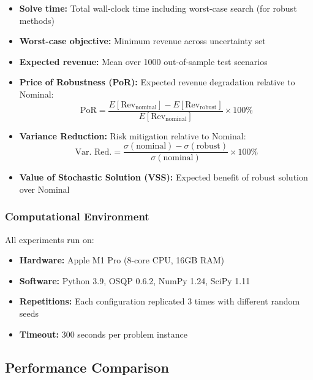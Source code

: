 \begin{itemize}
    \item \textbf{Solve time:} Total wall-clock time including worst-case search (for robust methods)
    \item \textbf{Worst-case objective:} Minimum revenue across uncertainty set
    \item \textbf{Expected revenue:} Mean over 1000 out-of-sample test scenarios
    \item \textbf{Price of Robustness (PoR):} Expected revenue degradation relative to Nominal:
    \begin{equation}
    \text{PoR} = \frac{E[\text{Rev}_{\text{nominal}}] - E[\text{Rev}_{\text{robust}}]}{E[\text{Rev}_{\text{nominal}}]} \times 100\%
    \end{equation}

    \item \textbf{Variance Reduction:} Risk mitigation relative to Nominal:
    \begin{equation}
    \text{Var. Red.} = \frac{\sigma(\text{nominal}) - \sigma(\text{robust})}{\sigma(\text{nominal})} \times 100\%
    \end{equation}

    \item \textbf{Value of Stochastic Solution (VSS):} Expected benefit of robust solution over Nominal
\end{itemize}

\subsubsection{Computational Environment}

All experiments run on:
\begin{itemize}
    \item \textbf{Hardware:} Apple M1 Pro (8-core CPU, 16GB RAM)
    \item \textbf{Software:} Python 3.9, OSQP 0.6.2, NumPy 1.24, SciPy 1.11
    \item \textbf{Repetitions:} Each configuration replicated 3 times with different random seeds
    \item \textbf{Timeout:} 300 seconds per problem instance
\end{itemize}

\subsection{Performance Comparison}
\label{sec:performance_comparison}

